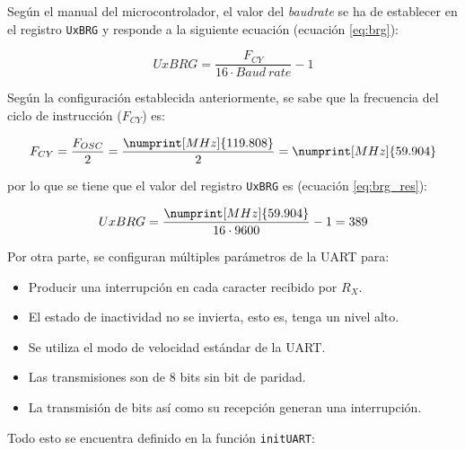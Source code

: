 Según el manual del microcontrolador, el valor del \textit{baudrate} se ha de establecer
en el registro \texttt{UxBRG} y responde a la siguiente ecuación (ecuación \ref{eq:brg}):

\begin{equation}\label{eq:brg}
    UxBRG = \frac{F_{CY}}{16 \cdot Baud~rate} - 1
\end{equation}

Según la configuración establecida anteriormente, se sabe que la frecuencia del ciclo
de instrucción ($F_{CY}$) es:

\begin{equation*}
    F_{CY} = \frac{F_{OSC}}{2} = \frac{\numprint[MHz]{119.808}}{2} = \numprint[MHz]{59.904}
\end{equation*}

por lo que se tiene que el valor del registro \texttt{UxBRG} es (ecuación \ref{eq:brg_res}):

\begin{equation}\label{eq:brg_res}
    UxBRG = \frac{\numprint[MHz]{59.904}}{16 \cdot 9600} - 1 = 389
\end{equation}

Por otra parte, se configuran múltiples parámetros de la \ac{UART} para:

\begin{itemize}
    \item Producir una interrupción en cada caracter recibido por $R_X$.
    \item El estado de inactividad no se invierta, esto es, tenga un nivel alto.
    \item Se utiliza el modo de velocidad estándar de la \ac{UART}.
    \item Las transmisiones son de 8 bits sin bit de paridad.
    \item La transmisión de bits así como su recepción generan una interrupción.
\end{itemize}

Todo esto se encuentra definido en la función \texttt{initUART}:


